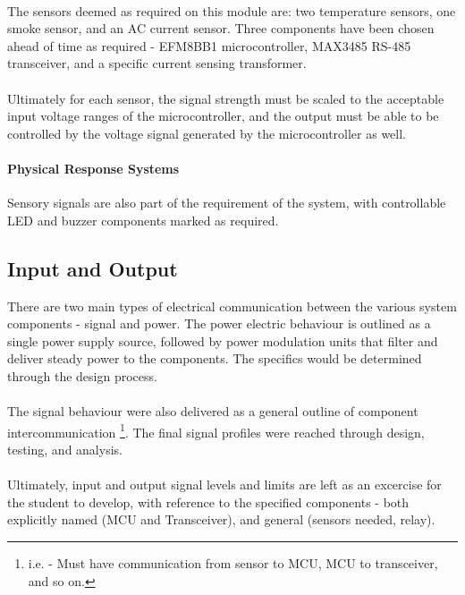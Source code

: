 \documentclass[12pt]{article}
\begin{document}
    \paragraph{}
    The sensors deemed as required on this module are: two temperature sensors, one smoke sensor, and an AC current sensor. Three components have been chosen ahead of time as required - EFM8BB1 microcontroller, MAX3485 RS-485 transceiver, and a specific current sensing transformer.
    
    \paragraph{}
    Ultimately for each sensor, the signal strength must be scaled to the acceptable input voltage ranges of the microcontroller, and the output must be able to be controlled by the voltage signal generated by the microcontroller as well.

    \paragraph{Physical Response Systems}
    Sensory signals are also part of the requirement of the system, with controllable LED and buzzer components marked as required.

    \subsection{Input and Output} 
    There are two main types of electrical communication between the various system components - signal and power. The power electric behaviour is outlined as a single power supply source, followed by power modulation units that filter and deliver steady power to the components. The specifics would be determined through the design process.

    \paragraph{}
    The signal behaviour were also delivered as a general outline of component intercommunication \footnote{i.e. - Must have communication from sensor to MCU, MCU to transceiver, and so on.}. The final signal profiles were reached through design, testing, and analysis.

    \paragraph{}
    Ultimately, input and output signal levels and limits are left as an excercise for the student to develop, with reference to the specified components - both explicitly named (MCU and Transceiver), and general (sensors needed, relay).
     
\end{document}

